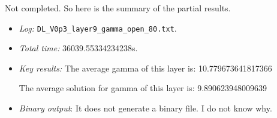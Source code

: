 \documentclass{llncs}
\begin{document}
Not completed. So here is the summary of the partial results.

\begin{itemize}
	\item \emph{Log:} \verb*|DL_V0p3_layer9_gamma_open_80.txt|.
	
	\item \emph{Total time:} 36039.55334234238s.
	
	\item \emph{Key results:}  The average gamma of this layer is:  10.779673641817366
	
	The average solution for gamma of this layer is:  9.890623948009639
	
	\item  \emph{Binary output}: It does not generate a binary file. I do not know why.
	
\end{itemize}
\end{document}
